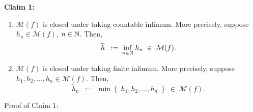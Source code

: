 \vskip 0.3cm
\noindent
\textbf{Claim 1:}\quad
\begin{enumerate}
\item
	$\mathcal{M}(f)$ is closed under taking countable infimum.
	More precisely, suppose $h_{n} \in \mathcal{M}(f)$, $n \in \mathbb{N}$.
	Then,
	\begin{equation*}
	\widetilde{h} \;\; := \; \underset{n\in\mathbb{N}}{\inf}\; h_{n} \;\in\; \mathcal{M}(f).
	\end{equation*}
\item
	$\mathcal{M}(f)$ is closed under taking finite infimum.
	More precisely, suppose $h_{1}, h_{2}, \ldots, h_{n} \in \mathcal{M}(f)$.
	Then,
	\begin{equation*}
	\widetilde{h}_{n} \;\; := \; \min\!\left\{\;h_{1},h_{2},\ldots,h_{n}\;\right\} \;\in\; \mathcal{M}(f).
	\end{equation*}
\end{enumerate}
\vskip 0.1cm
\noindent
Proof of Claim 1:

